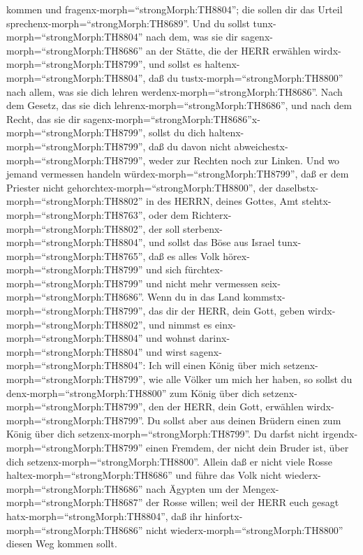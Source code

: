 kommen und fragenx-morph=``strongMorph:TH8804''; die sollen dir das
Urteil sprechenx-morph=``strongMorph:TH8689''.  Und du
sollst tunx-morph=``strongMorph:TH8804'' nach dem, was sie dir
sagenx-morph=``strongMorph:TH8686'' an der Stätte, die der HERR erwählen
wirdx-morph=``strongMorph:TH8799'', und sollst es
haltenx-morph=``strongMorph:TH8804'', daß du
tustx-morph=``strongMorph:TH8800'' nach allem, was sie dich lehren
werdenx-morph=``strongMorph:TH8686''.  Nach dem Gesetz, das
sie dich lehrenx-morph=``strongMorph:TH8686'', und nach dem Recht, das
sie dir
sagenx-morph=``strongMorph:TH8686''x-morph=``strongMorph:TH8799'',
sollst du dich haltenx-morph=``strongMorph:TH8799'', daß du davon nicht
abweichestx-morph=``strongMorph:TH8799'', weder zur Rechten noch zur
Linken.  Und wo jemand vermessen handeln
würdex-morph=``strongMorph:TH8799'', daß er dem Priester nicht
gehorchtex-morph=``strongMorph:TH8800'', der
daselbstx-morph=``strongMorph:TH8802'' in des HERRN, deines Gottes, Amt
stehtx-morph=``strongMorph:TH8763'', oder dem
Richterx-morph=``strongMorph:TH8802'', der soll
sterbenx-morph=``strongMorph:TH8804'', und sollst das Böse aus Israel
tunx-morph=``strongMorph:TH8765'',  daß es alles Volk
hörex-morph=``strongMorph:TH8799'' und sich
fürchtex-morph=``strongMorph:TH8799'' und nicht mehr vermessen
seix-morph=``strongMorph:TH8686''.  Wenn du in das Land
kommstx-morph=``strongMorph:TH8799'', das dir der HERR, dein Gott, geben
wirdx-morph=``strongMorph:TH8802'', und nimmst es
einx-morph=``strongMorph:TH8804'' und wohnst
darinx-morph=``strongMorph:TH8804'' und wirst
sagenx-morph=``strongMorph:TH8804'': Ich will einen König über mich
setzenx-morph=``strongMorph:TH8799'', wie alle Völker um mich her haben,
 so sollst du denx-morph=``strongMorph:TH8800'' zum König
über dich setzenx-morph=``strongMorph:TH8799'', den der HERR, dein Gott,
erwählen wirdx-morph=``strongMorph:TH8799''. Du sollst aber aus deinen
Brüdern einen zum König über dich setzenx-morph=``strongMorph:TH8799''.
Du darfst nicht irgendx-morph=``strongMorph:TH8799'' einen Fremdem, der
nicht dein Bruder ist, über dich setzenx-morph=``strongMorph:TH8800''.
 Allein daß er nicht viele Rosse
haltex-morph=``strongMorph:TH8686'' und führe das Volk nicht
wiederx-morph=``strongMorph:TH8686'' nach Ägypten um der
Mengex-morph=``strongMorph:TH8687'' der Rosse willen; weil der HERR euch
gesagt hatx-morph=``strongMorph:TH8804'', daß ihr
hinfortx-morph=``strongMorph:TH8686'' nicht
wiederx-morph=``strongMorph:TH8800'' diesen Weg kommen sollt.
